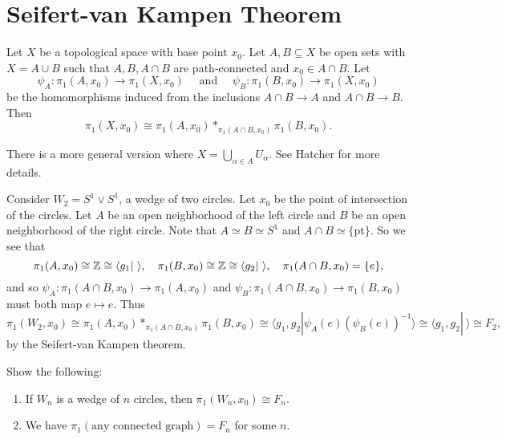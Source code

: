 \section{Seifert-van Kampen Theorem}
\begin{theorem}\label{thm:van-kampen}
  Let $X$ be a topological space with base point $x_0$.
  Let $A, B \subseteq X$ be open sets with
  $X = A \cup B$ such that $A, B, A \cap B$ are
  path-connected and $x_0 \in A \cap B$. Let
  \[
    \psi_A : \pi_1(A, x_0) \to \pi_1(X, x_0)
    \quad \text{ and } \quad
    \psi_B : \pi_1(B, x_0) \to \pi_1(X, x_0)
  \]
  be the homomorphisms induced from the inclusions
  $A \cap B \to A$ and $A \cap B \to B$. Then
  \[
    \pi_1(X, x_0) \cong \pi_1(A, x_0) *_{\pi_1(A \cap B, x_0)} \pi_1(B, x_0).
  \]
\end{theorem}

\begin{remark}
  There is a more general version where
  $X = \bigcup_{\alpha \in A} U_\alpha$. See Hatcher
  for more details.
\end{remark}

\begin{example}
  Consider $W_2 = S^1 \lor S^1$, a wedge of two circles.
  Let $x_0$ be the point of intersection of the circles.
  Let $A$ be an open neighborhood of the left circle
  and $B$ be an open neighborhood of the right circle.
  Note that $A \simeq B \simeq S^1$ and
  $A \cap B \simeq \{\text{pt}\}$. So we see that
  \[
    \pi_1(A, x_0) \cong \mathbb{Z} \cong
    \langle g_1 |\ \rangle, \quad
    \pi_1(B, x_0) \cong \mathbb{Z} \cong \langle g_2 |\ \rangle, \quad
    \pi_1(A \cap B, x_0) = \{e\},
  \]
  and so
  $\psi_A : \pi_1(A \cap B, x_0) \to \pi_1(A, x_0)$ and
  $\psi_B : \pi_1(A \cap B, x_0) \to \pi_1(B, x_0)$
  must both map $e \mapsto e$. Thus
  \[
    \pi_1(W_2, x_0) \cong \pi_1(A, x_0) *_{\pi_1(A \cap B, x_0)} \pi_1(B, x_0)
    \cong \langle g_1, g_2 | \psi_A(e)(\psi_B(e))^{-1} \rangle
    \cong \langle g_1, g_2 | \ \rangle
    \cong F_2,
  \]
  by the Seifert-van Kampen theorem.
\end{example}

\begin{exercise}
  Show the following:
  \begin{enumerate}
    \item If $W_n$ is a wedge of $n$ circles,
      then $\pi_1(W_n, x_0) \cong F_n$.
    \item We have
      $\pi_1(\text{any connected graph}) = F_n$
      for some $n$.
  \end{enumerate}
\end{exercise}

